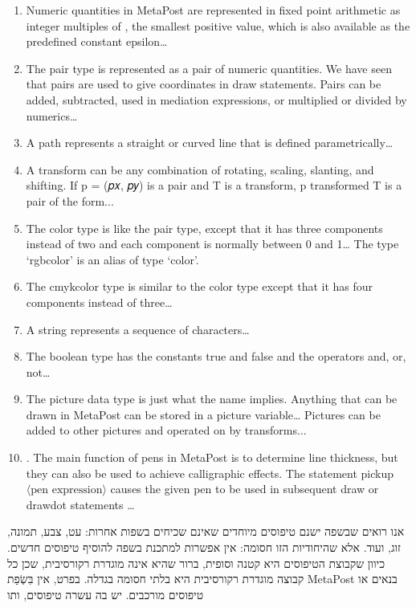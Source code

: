       \begin{enumerate}
      \item Numeric quantities in MetaPost are represented in fixed point arithmetic as integer multiples of , the smallest positive value, which is also available as the predefined constant epsilon…
      \item The pair type is represented as a pair of numeric quantities. We have seen that pairs are used to give coordinates in draw statements. Pairs can be added, subtracted, used in mediation expressions, or multiplied or divided by numerics…
      \item A path represents a straight or curved line that is defined parametrically…
      \item A transform can be any combination of rotating, scaling, slanting, and shifting. If p = (𝑝𝑥, 𝑝𝑦) is a pair and T is a transform,
      p transformed T
      is a pair of the form...
      \item The color type is like the pair type, except that it has three components instead of two and each component is normally between 0 and 1… The type ‘rgbcolor’ is an alias of type ‘color’.
      \item The cmykcolor type is similar to the color type except that it has four components instead of three…
      \item A string represents a sequence of characters…
      \item The boolean type has the constants true and false and the operators and, or, not…
      \item The picture data type is just what the name implies. Anything that can be drawn in MetaPost can be stored in a picture variable… Pictures can be added to other pictures and operated on by transforms...
      \item. The main function of pens in MetaPost is to determine line thickness, but they can also be used to achieve calligraphic effects. The statement pickup $⟨\text{pen expression}⟩$ causes the given pen to be used in subsequent draw or drawdot statements …

  \end{enumerate}
      אנו רואים שבשפה ישנם טיפוסים מיוחדים שאינם שכיחים בשפות אחרות: עט, צבע,
      תמונה, זוג, ועוד. אלא שהיחודיות הזו חסומה: אין אפשרות למתכנת בשפה להוסיף
      טיפוסים חדשים. כיוון שקבוצת הטיפוסים היא קטנה וסופית, ברור שהיא אינה
      מוגדרת רקורסיבית, שכן כל קבוצה מוגדרת רקורסיבית היא בלתי חסומה בגדלה.
      בפרט, אין בִּשְׂפַת MetaPost בנאים או טיפוסים מורכבים. יש בה עשרה טיפוסים, ותו
